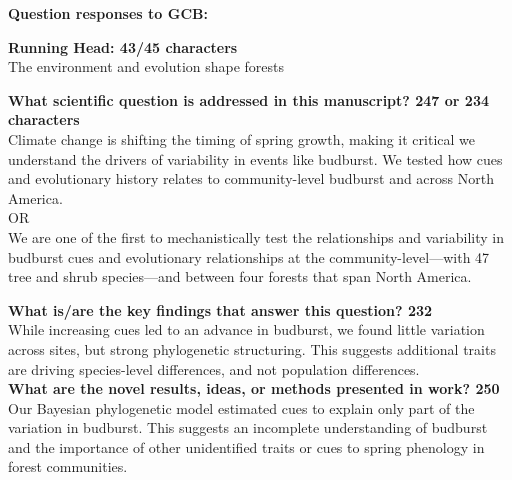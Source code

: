 \documentclass{letter}
\begin{document}
\textbf{Question responses to GCB:}


\textbf{Running Head: 43/45 characters}\\

The environment and evolution shape forests 


\textbf{What scientific question is addressed in this manuscript? 247 or 234 characters}\\
Climate change is shifting the timing of spring growth, making it critical we understand the drivers of variability in events like budburst. We tested how cues and evolutionary history relates to community-level budburst and across North America. \\

OR\\

We are one of the first to mechanistically test the relationships and variability in budburst cues and evolutionary relationships at the community-level—with 47 tree and shrub species—and between four forests that span North America. 


\textbf{What is/are the key findings that answer this question? 232}\\

While increasing cues led to an advance in budburst, we found little variation across sites, but strong phylogenetic structuring. This suggests additional traits are driving species-level differences, and not population differences.\\


\textbf{What are the novel results, ideas, or methods presented in work? 250}\\
Our Bayesian phylogenetic model estimated cues to explain only part of the variation in budburst. This suggests an incomplete understanding of budburst and the importance of other unidentified traits or cues to spring phenology in forest communities.\\
\end{document}
